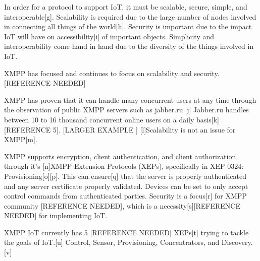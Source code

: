 In order for a protocol to support IoT, it must be scalable, secure, simple, 
and interoperable[g]. Scalability is required due to the large number of nodes 
involved in connecting all things of the world[h]. Security is important due 
to the impact IoT will have on accessibility[i] of important objects. 
Simplicity and interoperability come hand in hand due to the diversity of the 
things involved in IoT.

XMPP has focused and continues to focus on scalability and security. 
[REFERENCE NEEDED]

XMPP has proven that it can handle many concurrent users at any time through 
the observation of public XMPP servers such as jabber.ru.[j] Jabber.ru handles 
between 10 to 16 thousand concurrent online users on a daily basis[k] 
[REFERENCE 5]. [LARGER EXAMPLE ] [l]Scalability is not an issue for XMPP[m].

XMPP supports encryption, client authentication, and client authorization 
through it's [n]XMPP Extension Protocols (XEPs), specifically in XEP-0324: 
Provisioning[o][p]. This can ensure[q] that the server is properly 
authenticated and any server certificate properly validated. Devices can be 
set to only accept control commands from authenticated parties. Security is a 
focus[r] for XMPP community [REFERENCE NEEDED], which is a 
necessity[s][REFERENCE NEEDED] for implementing IoT.

XMPP IoT currently has 5 [REFERENCE NEEDED]  XEPs[t] trying to tackle the 
goals of IoT.[u] Control, Sensor, Provisioning, Concentrators, and 
Discovery.[v]
